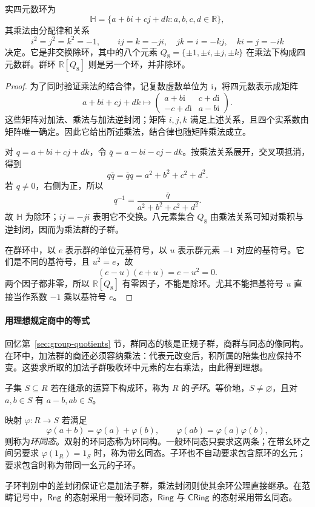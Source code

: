 \documentclass[lang=cn,a4paper,fontset=none,zihao=false,10pt,openany,twoside]{beautybook}
\numberwithin{algorithm}{chapter}
\begin{document}
\begin{example}[四元数除环与四元数群]
实四元数环为
\[
 \mathbb H=\{a+bi+cj+dk:a,b,c,d\in\mathbb R\},
\]
其乘法由分配律和关系
\[
 i^2=j^2=k^2=-1,\qquad ij=k=-ji,\quad jk=i=-kj,\quad ki=j=-ik
\]
决定。它是非交换除环，其中的八个元素 $Q_8=\{\pm1,\pm i,\pm j,\pm k\}$ 在乘法下构成四元数群。群环 $\mathbb R[Q_8]$ 则是另一个环，并非除环。
\end{example}
\begin{proof}
为了同时验证乘法的结合律，记复数虚数单位为 $\mathrm i$，将四元数表示成矩阵
\[
 a+bi+cj+dk\longmapsto
 \begin{pmatrix}
 a+b\mathrm i&c+d\mathrm i\\
 -c+d\mathrm i&a-b\mathrm i
 \end{pmatrix}.
\]
这些矩阵对加法、乘法与加法逆封闭；矩阵 $i,j,k$ 满足上述关系，且四个实系数由矩阵唯一确定。因此它给出所述乘法，结合律也随矩阵乘法成立。

对 $q=a+bi+cj+dk$，令 $\overline q=a-bi-cj-dk$。按乘法关系展开，交叉项抵消，得到
\[
 q\overline q=\overline q q=a^2+b^2+c^2+d^2.
\]
若 $q\ne0$，右侧为正，所以
\[
 q^{-1}=\frac{\overline q}{a^2+b^2+c^2+d^2}.
\]
故 $\mathbb H$ 为除环；$ij=-ji$ 表明它不交换。八元素集合 $Q_8$ 由乘法关系可知对乘积与逆封闭，因而为乘法群的子群。

在群环中，以 $e$ 表示群的单位元基符号，以 $u$ 表示群元素 $-1$ 对应的基符号。它们是不同的基符号，且 $u^2=e$，故
\[
 (e-u)(e+u)=e-u^2=0.
\]
两个因子都非零，所以 $\mathbb R[Q_8]$ 有零因子，不能是除环。尤其不能把基符号 $u$ 直接当作系数 $-1$ 乘以基符号 $e$。
\end{proof}

\paragraph{用理想规定商中的等式}
回忆第~\ref{sec:group-quotients} 节，群同态的核是正规子群，商群与同态的像同构。在环中，加法群的商还必须容纳乘法：代表元改变后，积所属的陪集也应保持不变。这要求所取的加法子群吸收环中元素的左右乘法，由此得到理想。
\begin{definition}[子环与环同态]
子集 $S\subseteq R$ 若在继承的运算下构成环，称为 $R$ 的\emph{子环}。等价地，$S\ne\varnothing$，且对 $a,b\in S$ 有 $a-b,ab\in S$。

映射 $\varphi:R\to S$ 若满足
\[
 \varphi(a+b)=\varphi(a)+\varphi(b),\qquad
 \varphi(ab)=\varphi(a)\varphi(b),
\]
则称为\emph{环同态}。双射的环同态称为环同构。一般环同态只要求这两条；在带幺环之间另要求 $\varphi(1_R)=1_S$ 时，称为带幺同态。子环也不自动要求包含原环的幺元；要求包含时称为带同一幺元的子环。
\end{definition}
子环判别中的差封闭保证它是加法子群，乘法封闭则使其余环公理直接继承。在范畴记号中，$\mathsf{Rng}$ 的态射采用一般环同态，$\mathsf{Ring}$ 与 $\mathsf{CRing}$ 的态射采用带幺同态。
\end{document}
